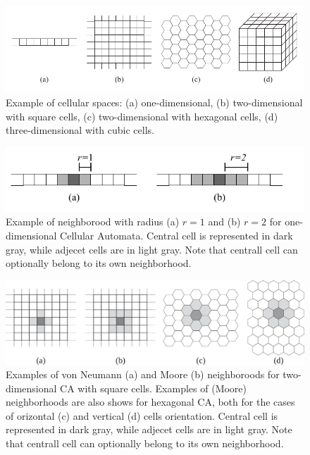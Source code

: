 \begin{figure}
  \begin{center}


    \includegraphics[width=12cm]{./images/CellularAutomata/cellularspaces}

    \caption{Example of cellular spaces: (a) one-dimensional, (b)
      two-dimensional with square cells, (c) two-dimensional with
      hexagonal cells, (d) three-dimensional with cubic cells.}
    \label{fig:cellularspaces}
  \end{center}
\end{figure}

\begin{figure}
  \begin{center}
    \includegraphics[width=12cm]{./images/CellularAutomata/onedimensional.pdf}
    \caption{Example of neighborood with radius (a) $r = 1$ and (b) $r
      = 2$ for one-dimensional Cellular Automata. Central cell is
      represented in dark gray, while adjecet cells are in light
      gray. Note that centrall cell can optionally belong to its own
      neighborhood.}
    \label{fig:1Dneighborhood}
  \end{center}
\end{figure}

\begin{figure}
  \begin{center}
    \includegraphics[width=12cm]{./images/CellularAutomata/2Dneighborhoods.png}
    \caption{Examples of von Neumann (a) and Moore (b) neighboroods
      for two-dimensional CA with square cells. Examples of (Moore)
      neighborhoods are also shows for hexagonal CA, both for the
      cases of orizontal (c) and vertical (d) cells
      orientation. Central cell is represented in dark gray, while
      adjecet cells are in light gray. Note that centrall cell can
      optionally belong to its own neighborhood.}
    \label{fig:2Dneighborhood}
  \end{center}
\end{figure}


